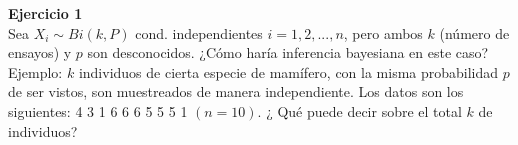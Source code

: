 \documentclass[a4paper, 11pt]{article}
\newenvironment{problem}[2][Ejercicio]
{ \begin{mdframed}[backgroundcolor= red!50] \textbf{#1 #2} \\}
	{  \end{mdframed}}
\begin{document}
	\setlength{\parskip}{\medskipamount}
	\setlength{\parindent}{0pt}
\begin{problem}{1} 
    Sea $X_i \sim Bi(k,P)$ cond. independientes $i = 1,2,...,n$, pero ambos $k$ (número de ensayos) y $p$ son desconocidos. ¿Cómo haría inferencia bayesiana en este caso? Ejemplo: $k$ individuos de cierta especie de mamífero, con la misma probabilidad $p$ de ser vistos, son muestreados de manera independiente. Los datos son los siguientes: 4 3 1 6 6 6 5 5 5 1 $(n=10)$. ¿ Qué puede decir sobre el total $k$ de individuos?
\end{problem}
\end{document}
